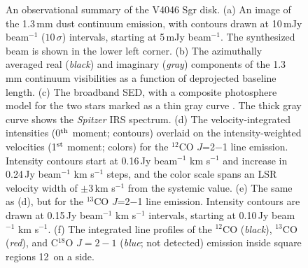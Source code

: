 {\begin{figure}[t!]
\caption{An observational summary of the V4046
Sgr disk.  (a) An image of the 1.3\,mm dust continuum emission, with contours
drawn at 10\,mJy beam$^{-1}$ ($10$\,$\sigma$) intervals, starting at 5\,mJy
beam$^{-1}$.  The synthesized beam is shown in the lower left corner.  (b) The
azimuthally averaged real ({\it black}) and imaginary ({\it gray}) components
of the 1.3\,mm continuum visibilities as a function of deprojected baseline
length.  (c) The broadband SED, with a composite photosphere model for the two
stars marked as a thin gray curve \citep[see][]{rosenfeld12}.  The thick gray
curve shows the {\it Spitzer} IRS spectrum.  (d) The velocity-integrated
intensities (0$^{\rm th}$ moment; contours) overlaid on the intensity-weighted
velocities (1$^{\rm st}$ moment; colors) for the $^{12}$CO $J$=2$-$1 line
emission.  Intensity contours start at 0.16\,Jy beam$^{-1}$ km s$^{-1}$ and
increase in 0.24\,Jy beam$^{-1}$ km s$^{-1}$ steps, and the color scale spans
an LSR velocity width of $\pm$3\,km s$^{-1}$ from the systemic value.  (e) The
same as (d), but for the $^{13}$CO $J$=2$-$1 line emission.  Intensity contours
are drawn at 0.15\,Jy beam$^{-1}$ km s$^{-1}$ intervals, starting at 0.10\,Jy
beam$^{-1}$ km s$^{-1}$.  (f) The integrated line profiles of the $^{12}$CO
({\it black}), $^{13}$CO ({\it red}), and C$^{18}$O $J=2-1$ ({\it blue}; not
detected) emission inside square regions 12\arcsec\ on a side.
\label{fig:summary}}
\end{figure}

}
